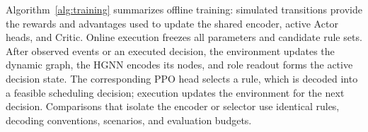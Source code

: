 Algorithm~\ref{alg:training} summarizes offline training: simulated transitions provide the
rewards and advantages used to update the shared encoder, active Actor heads, and Critic.
Online execution freezes all parameters and candidate rule sets. After observed events or an executed
decision, the environment updates the dynamic graph, the HGNN encodes its nodes, and role readout
forms the active decision state. The corresponding PPO head selects a rule, which is decoded into
a feasible scheduling decision; execution updates the environment for the next decision.
Comparisons that isolate the encoder or selector use identical rules,
decoding conventions, scenarios, and evaluation budgets.


